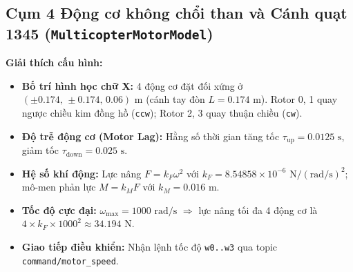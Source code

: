 \documentclass[11pt,a4paper]{article}
\begin{document}
\vspace{1em}

\subsection{Cụm 4 Động cơ không chổi than và Cánh quạt 1345 (\texttt{MulticopterMotorModel})}
\noindent
\begin{minipage}[t]{0.45\textwidth}
\vspace{0pt}
\textbf{Giải thích cấu hình:}
\begin{itemize}
    \item \textbf{Bố trí hình học chữ X:} 4 động cơ đặt đối xứng ở $(\pm 0.174,\, \pm 0.174,\, 0.06)\text{ m}$ (cánh tay đòn $L = 0.174\text{ m}$). Rotor 0, 1 quay ngược chiều kim đồng hồ (\texttt{ccw}); Rotor 2, 3 quay thuận chiều (\texttt{cw}).
    \item \textbf{Độ trễ động cơ (Motor Lag):} Hằng số thời gian tăng tốc $\tau_{\text{up}} = 0.0125\text{ s}$, giảm tốc $\tau_{\text{down}} = 0.025\text{ s}$.
    \item \textbf{Hệ số khí động:} Lực nâng $F = k_F \omega^2$ với $k_F = 8.54858 \times 10^{-6}\text{ N}/(\text{rad/s})^2$; mô-men phản lực $M = k_M F$ với $k_M = 0.016\text{ m}$.
    \item \textbf{Tốc độ cực đại:} $\omega_{\max} = 1000\text{ rad/s}$ $\Rightarrow$ lực nâng tối đa 4 động cơ là $4 \times k_F \times 1000^2 \approx 34.194\text{ N}$.
    \item \textbf{Giao tiếp điều khiển:} Nhận lệnh tốc độ \texttt{w0..w3} qua topic \texttt{command/motor\_speed}.
\end{itemize}
\end{minipage}
\hfill
\end{document}

